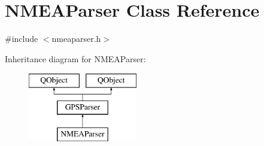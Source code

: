\hypertarget{class_n_m_e_a_parser}{\section{N\-M\-E\-A\-Parser Class Reference}
\label{class_n_m_e_a_parser}
}


{\ttfamily \#include $<$nmeaparser.\-h$>$}

Inheritance diagram for N\-M\-E\-A\-Parser\-:\begin{figure}[H]
\begin{center}
\leavevmode
\includegraphics[height=3.000000cm]{class_n_m_e_a_parser}
\end{center}
\end{figure}
